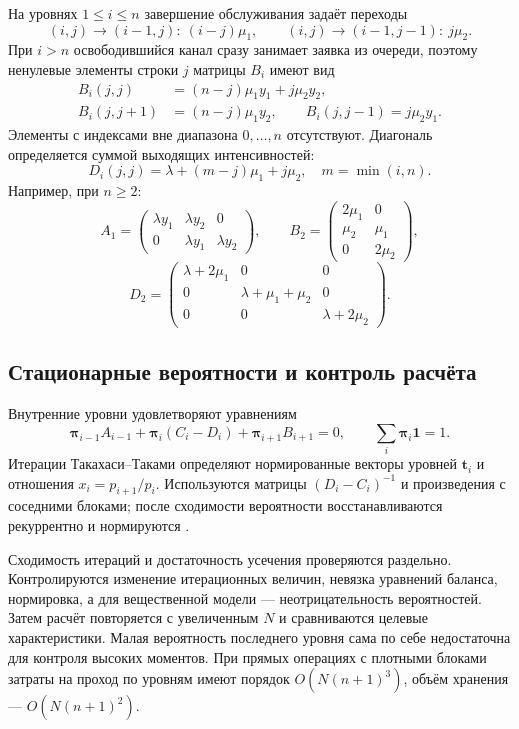 \documentclass[a4paper,12pt]{article}
\begin{document}
На уровнях \(1\le i\le n\) завершение обслуживания задаёт переходы
\[
(i,j)\to(i-1,j):\ (i-j)\mu_1,\qquad
(i,j)\to(i-1,j-1):\ j\mu_2.
\]
При \(i>n\) освободившийся канал сразу занимает заявка из очереди, поэтому ненулевые элементы строки \(j\) матрицы \(B_i\) имеют вид
\begin{align*}
B_i(j,j)&=(n-j)\mu_1y_1+j\mu_2y_2,\\
B_i(j,j+1)&=(n-j)\mu_1y_2,\qquad
B_i(j,j-1)=j\mu_2y_1.
\end{align*}
Элементы с индексами вне диапазона \(0,\ldots,n\) отсутствуют. Диагональ определяется суммой выходящих интенсивностей:
\[
D_i(j,j)=\lambda+(m-j)\mu_1+j\mu_2,\quad m=\min(i,n).
\]
Например, при \(n\ge2\):
\[
A_1=\begin{pmatrix}\lambda y_1&\lambda y_2&0\\0&\lambda y_1&\lambda y_2\end{pmatrix},\qquad
B_2=\begin{pmatrix}2\mu_1&0\\\mu_2&\mu_1\\0&2\mu_2\end{pmatrix},
\]
\[
D_2=\begin{pmatrix}\lambda+2\mu_1&0&0\\0&\lambda+\mu_1+\mu_2&0\\0&0&\lambda+2\mu_2\end{pmatrix}.
\]

\subsection{Стационарные вероятности и контроль расчёта}
Внутренние уровни удовлетворяют уравнениям
\[
\boldsymbol\pi_{i-1}A_{i-1}+\boldsymbol\pi_i(C_i-D_i)+\boldsymbol\pi_{i+1}B_{i+1}=0,
\qquad \sum_i\boldsymbol\pi_i\mathbf1=1.
\]
Итерации Такахаси--Таками определяют нормированные векторы уровней \(\boldsymbol t_i\) и отношения \(x_i=p_{i+1}/p_i.\) Используются матрицы \((D_i-C_i)^{-1}\) и произведения с соседними блоками; после сходимости вероятности восстанавливаются рекуррентно и нормируются \cite{takahashi1976,ryzhikov2018ru}.

Сходимость итераций и достаточность усечения проверяются раздельно. Контролируются изменение итерационных величин, невязка уравнений баланса, нормировка, а для вещественной модели --- неотрицательность вероятностей. Затем расчёт повторяется с увеличенным \(N\) и сравниваются целевые характеристики. Малая вероятность последнего уровня сама по себе недостаточна для контроля высоких моментов. При прямых операциях с плотными блоками затраты на проход по уровням имеют порядок \(O(N(n+1)^3)\), объём хранения --- \(O(N(n+1)^2).\)
\end{document}
